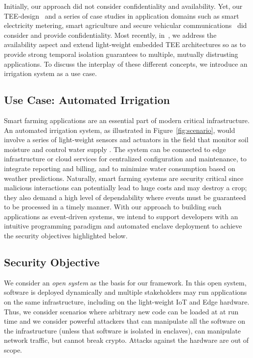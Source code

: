 \documentclass[sigconf]{acmart}
\begin{document}
Initially, our approach did not consider confidentiality and availability.
Yet, our \ac{TEE}-design~\cite{noorman_sancus2} and a series of case
studies in application domains such as smart electricity metering, smart
agriculture and secure vehicular communications~\cite{muehlber_smart_meter,
scopelliti2020thesis, vanbulck_2017vulcan} did consider and
provide confidentiality. Most recently, in~\cite{alder_2021_aion}, we
address the availability aspect and extend light-weight embedded
\ac{TEE} architectures so as to provide strong temporal isolation
guarantees to multiple, mutually distrusting applications. To discuss the
interplay of these different concepts, we introduce an irrigation system as
a use case.

\subsection{Use Case: Automated Irrigation}

Smart farming applications are an essential part of modern critical
infrastructure. An automated irrigation system, as illustrated in
Figure~\ref{fig:scenario}, would involve a series of light-weight sensors
and actuators in the field that monitor soil moisture and control water supply
. The system can be
connected to edge infrastructure or cloud services for centralized
configuration and maintenance, to integrate reporting and billing, and to
minimize water consumption based on weather predictions. Naturally, smart
farming systems are security critical since malicious interactions can
potentially lead to huge costs and may destroy a crop; they also demand a
high level of dependability where events must be guaranteed to be processed
in a timely manner. With our approach to building such applications as
event-driven systems, we intend to support developers with an intuitive
programming paradigm and automated enclave deployment to achieve the security objectives highlighted below.

\subsection{Security Objective}

We consider an \emph{open system} as the basis for our framework. In this
open system, software is deployed dynamically and multiple stakeholders may
run applications on the same infrastructure, including on the light-weight
IoT and Edge hardware. Thus, we consider scenarios where arbitrary new code
can be loaded at at run time and we consider powerful attackers that can
manipulate all the software on the infrastructure (unless that software is
isolated in enclaves), can manipulate network traffic, but cannot break
crypto. Attacks against the hardware are out of scope.
\end{document}
